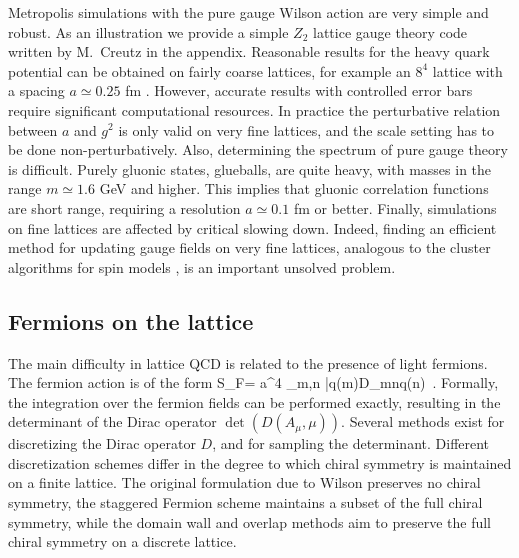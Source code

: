 Metropolis simulations with the pure gauge Wilson action are very simple 
and robust. As an illustration we provide a simple $Z_2$ lattice gauge 
theory code written by M.~Creutz in the appendix. Reasonable results for the 
heavy quark potential can be obtained on fairly coarse lattices, for example 
an $8^4$ lattice with a spacing $a\simeq 0.25$ fm \cite{Lepage:1998dt}.
However, accurate results with controlled error bars require significant 
computational resources. In practice the perturbative relation between 
$a$ and $g^2$ is only valid on very fine lattices, and the scale setting 
has to be done non-perturbatively. Also, determining the spectrum of pure 
gauge theory is difficult. Purely gluonic states, glueballs, are quite heavy, 
with masses in the range $m\simeq 1.6$ GeV and higher. This implies that 
gluonic correlation functions are short range, requiring a resolution 
$a\simeq 0.1$ fm or better. Finally, simulations on fine lattices are 
affected by critical slowing down. Indeed, finding an efficient method 
for updating gauge fields on very fine lattices, analogous to the cluster 
algorithms for spin models \cite{Wolff:1988uh}, is an important unsolved 
problem.

\subsection{Fermions on the lattice}
\label{sec_fermions}
 
 The main difficulty in lattice QCD is related to the presence
of light fermions. The fermion action is of the form
\be 
 S_F= a^4 \sum_{m,n} \bar{q}(m)D_{mn}q(n)\, . 
\ee
Formally, the integration over the fermion fields 
can be performed exactly, resulting in the determinant of the Dirac 
operator $\det(D(A_\mu,\mu))$. Several methods exist for discretizing 
the Dirac operator $D$, and for sampling the determinant. Different 
discretization schemes differ in the degree to which chiral symmetry 
is maintained on a finite lattice. The original formulation due to Wilson 
\cite{Wilson:1974sk} preserves no chiral symmetry, the staggered Fermion 
scheme \cite{Kogut:1974ag} maintains a subset of the full chiral symmetry, 
while the domain wall \cite{Kaplan:1992bt} and overlap methods
\cite{Neuberger:1997fp} aim to preserve the full chiral symmetry on 
a discrete lattice. 


